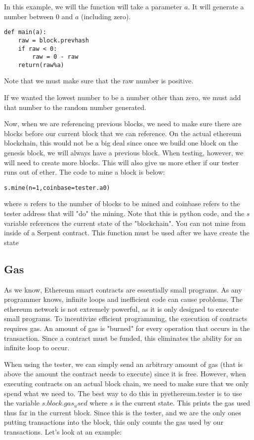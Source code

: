 \documentclass[12pt]{article}
\begin{document}
In this example, we will the function will take a parameter $a$. It will generate a number between 0 and $a$ (including zero).

\begin{verbatim}
def main(a):
	raw = block.prevhash
	if raw < 0:
		raw = 0 - raw
	return(raw%a)
\end{verbatim}

Note that we must make sure that the raw number is positive. \cite{PeterBorah2014}

If we wanted the lowest number to be a number other than zero, we must add that number to the random number generated. 

Now, when we are referencing previous blocks, we need to make sure there are blocks before our current block that we can reference. On the actual ethereum blockchain, this would not be a big deal since once we build one block on the genesis block, we will always have a previous block. When testing, however, we will need to create more blocks. This will also give us more ether if our tester runs out of ether. The code to mine a block is below:

\begin{verbatim}
s.mine(n=1,coinbase=tester.a0)
\end{verbatim}

where $n$ refers to the number of blocks to be mined and coinbase refers to the tester address that will "do" the mining. Note that this is python code, and the $s$ variable references the current state of the "blockchain". You can not mine from inside of a Serpent contract. This function must be used after we have create the state \cite{Usingpyethereum.tester}

\subsection{Gas}
As we know, Ethereum smart contracts are essentially small programs. As any programmer knows, infinite loops and inefficient code can cause problems. The ethereum network is not extremely powerful, as it is only designed to execute small programs. To incentivize efficient programming, the execution of contracts requires gas. An amount of gas is "burned" for every operation that occurs in the transaction. Since a contract must be funded, this eliminates the ability for an infinite loop to occur.

When using the tester, we can simply send an arbitrary amount of gas (that is above the amount the contract needs to execute) since it is free. However, when executing contracts on an actual block chain, we need to make sure that we only spend what we need to. The best way to do this in pyethereum.tester is to use the variable $s.block.gas_used$ where $s$ is the current state. This prints the gas used thus far in the current block. Since this is the tester, and we are the only ones putting transactions into the block, this only counts the gas used by our transactions. Let's look at an example:
\end{document}
